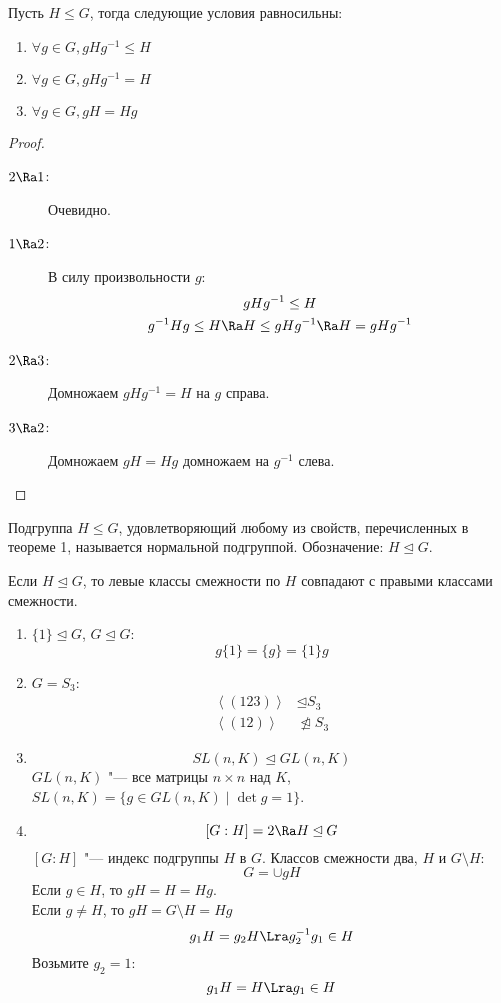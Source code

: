 \begin{theorem}
	Пусть $H \le G$, тогда следующие условия равносильны:
	\begin{enumerate}
		\item $\forall g \in G, gHg^{-1} \le H$
		\item $\forall g \in G, gHg^{-1} = H$
		\item $\forall g \in G, gH = Hg$
	\end{enumerate}
\end{theorem}
\begin{proof}\begin{description}
\item[$2 \Ra 1$:]
	Очевидно.

\item[$1 \Ra 2$:]
	В силу произвольности $g$:
	\begin{gather*}
		gHg^{-1} \le H \\
		g^{-1}Hg \le H \Ra H \le gHg^{-1} \Ra H = gHg^{-1}
	\end{gather*}

\item[$2 \Ra 3$:]
	Домножаем $gHg^{-1} = H$ на $g$ справа.

\item[$3 \Ra 2$:]
	Домножаем $gH = Hg$ домножаем на $g^{-1}$ слева.
\end{description}\end{proof}

\begin{Def}
	Подгруппа $H \le G$, удовлетворяющий любому из свойств, перечисленных в теореме 1, называется нормальной подгруппой.
	Обозначение: $H \unlhd G$.
\end{Def}

\begin{conseq}
	Если $H \unlhd G$, то левые классы смежности по $H$ совпадают с правыми классами смежности.
\end{conseq}
\begin{exmp}\hfill\begin{enumerate}
\item
	$\{1\} \unlhd G$, $G \unlhd G$:
	\[ g\{1\} = \{g\} = \{1\}g \]

\item
	$G = S_3$:
	\begin{align*}
		\left<(123)\right> &\unlhd S_3 \\
		\left<(12)\right> &\ntrianglelefteq S_3
	\end{align*}

\item
	\[ SL(n, K) \unlhd GL(n, K) \]
	$GL(n, K)$ "--- все матрицы $n \times n$ над $K$,
	$SL(n, K) = \{g \in GL(n, K) \mid \det g = 1 \}$.

\item
	\[ [G:H] = 2 \Ra H \unlhd G \]
	$[G:H]$ "--- индекс подгруппы $H$ в $G$.
	Классов смежности два, $H$ и $G \setminus H$:
	\[ G = \cup gH \]
	Если $g \in H$, то $gH = H = Hg$.\\
	Если $g \ne H$, то $gH = G \setminus H = Hg$\\
	\[ g_1H = g_2H \Lra g_2^{-1}g_1 \in H \]
	Возьмите $g_2 = 1$:
	\[ g_1H = H \Lra g_1 \in H \]
\end{enumerate}\end{exmp}

